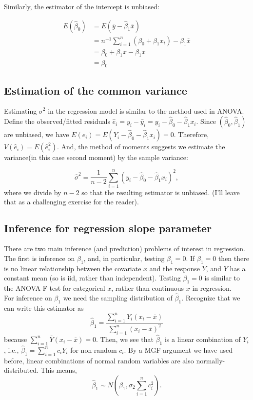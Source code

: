 \documentclass[
]{book}
\begin{document}
Similarly, the estimator of the intercept is unbiased:

\[
\begin{aligned}
E(\hat\beta_0) & = E(\bar y - \hat\beta_1 \bar x)\\
& = n^{-1}\sum_{i=1}^n (\beta_0 + \beta_1x_i) - \beta_1 \bar x\\
& = \beta_0 + \beta_1 \bar x - \beta_1 \bar x\\
& = \beta_0
\end{aligned}
\]

\hypertarget{estimation-of-the-common-variance}{%
\subsection{Estimation of the common variance}\label{estimation-of-the-common-variance}}

Estimating \(\sigma^2\) in the regression model is similar to the method used in ANOVA. Define the observed/fitted residuals \(\hat e_i = y_i - \hat y_i = y_i - \hat\beta_0 - \hat\beta_1 x_i\). Since \((\hat\beta_0, \hat\beta_1)\) are unbiased, we have \(E(\hat e_i) = E(Y_i - \hat\beta_0 - \hat\beta_1 x_i) = 0\). Therefore, \(V(\hat e_i) = E(\hat e_i ^2)\). And, the method of moments suggests we estimate the variance(in this case second moment) by the sample variance:

\[\hat\sigma^2 = \frac{1}{n-2}\sum_{i=1}^n (y_i - \hat\beta_0 - \hat\beta_1 x_i)^2,\]
where we divide by \(n-2\) so that the resulting estimator is unbiased. (I'll leave that as a challenging exercise for the reader).

\hypertarget{inference-for-regression-slope-parameter}{%
\subsection{Inference for regression slope parameter}\label{inference-for-regression-slope-parameter}}

There are two main inference (and prediction) problems of interest in regression. The first is inference on \(\beta_1\), and, in particular, testing \(\beta_1 = 0\). If \(\beta_1=0\) then there is no linear relationship between the covariate \(x\) and the response \(Y\), and \(Y\) has a constant mean (so is iid, rather than independent). Testing \(\beta_1=0\) is similar to the ANOVA F test for categorical \(x\), rather than continuous \(x\) in regression.\\

For inference on \(\beta_1\) we need the sampling distribution of \(\hat\beta_1\). Recognize that we can write this estimator as
\[\hat\beta_1 = \frac{\sum_{i=1}^n Y_i(x_i - \bar x)}{\sum_{i=1}^n (x_i - \bar x)^2}\] because \(\sum_{i=1}^n \bar Y(x_i - \bar x) = 0\). Then, we see that \(\hat\beta_1\) is a linear combination of \(Y_i\), i.e., \(\hat\beta_1 = \sum_{i=1}^nc_i Y_i\) for non-random \(c_i\). By a MGF argument we have used before, linear combinations of normal random variables are also normally-distributed. This means,
\[\hat\beta_1 \sim N\left(\beta_1, \sigma_2\sum_{i=1}^n c_i^2\right).\]
\end{document}
